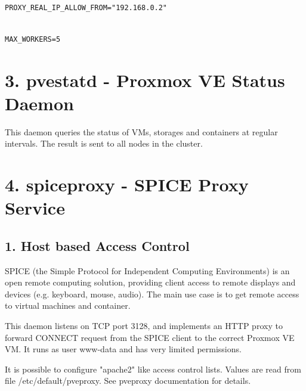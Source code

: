 \begin{lstlisting}

PROXY_REAL_IP_ALLOW_FROM="192.168.0.2"

\end{lstlisting}

\begin{lstlisting}

MAX_WORKERS=5

\end{lstlisting}

\begin{table}[htbp]

\centering

\begin{tabular}

\end{tabular}

\end{table}


\section{3. pvestatd - Proxmox VE Status Daemon}

This daemon queries the status of VMs, storages and containers at regular intervals. The result is sent to all nodes in the cluster.


\section{4. spiceproxy - SPICE Proxy Service}

\subsection{1. Host based Access Control}

SPICE (the Simple Protocol for Independent Computing Environments) is an open remote computing solution, providing client access to remote displays and devices (e.g. keyboard, mouse, audio). The main use case is to get remote access to virtual machines and container.

This daemon listens on TCP port 3128, and implements an HTTP proxy to forward CONNECT request from the SPICE client to the correct Proxmox VE VM. It runs as user www-data and has very limited permissions.

It is possible to configure "apache2" like access control lists. Values are read from file /etc/default/pveproxy. See pveproxy documentation for details.


